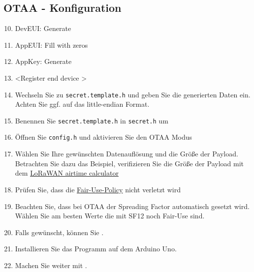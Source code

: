 \documentclass[12pt]{article}
\begin{document}
    \subsection{OTAA - Konfiguration}
      \begin{enumerate}
        \setcounter{enumi}{9}
        \item DevEUI: Generate
        \item AppEUI: Fill with zeros
        \item AppKey: Generate
        \item \textless Register end device \textgreater{}
        \item Wechseln Sie zu \texttt{secret.template.h} und geben Sie die generierten Daten ein.
          Achten Sie ggf. auf das little-endian Format.
        \item Benennen Sie \texttt{secret.template.h} in \texttt{secret.h} um
        \item Öffnen Sie \texttt{config.h} und aktivieren Sie den OTAA Modus
        \item Wählen Sie Ihre gewünschten Datenauflösung und die Größe der Payload.
          Betrachten Sie dazu das Beispiel, verifizieren Sie die Größe der Payload mit dem
          \href{https://www.thethingsnetwork.org/airtime-calculator}{LoRaWAN airtime calculator}
        \item Prüfen Sie, dass die \href{https://www.thethingsnetwork.org/docs/lorawan/duty-cycle/}{Fair-Use-Policy} nicht verletzt wird
        \item Beachten Sie, dass bei OTAA der Spreading Factor automatisch gesetzt wird.
          Wählen Sie am besten Werte die mit SF12 noch Fair-Use sind.
        \item Falls gewünscht, können Sie \underline{}.
        \item Installieren Sie das Programm auf dem Arduino Uno.
        \item Machen Sie weiter mit \underline{}.
      \end{enumerate}
\end{document}
